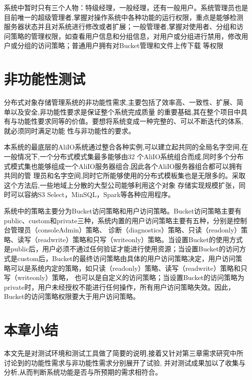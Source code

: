 系统中暂时只有三个人物：特级经理，一般经理，还有一般用户。系统管理员也是目前唯一的超级管理者,掌握对操作系统中各种功能的运行权限，重点是能够检测服务器状态并且对系统进行修改或者扩展；一般管理者,掌握对使用者、分组和访问策略的管理权限，如查看用户信息和分组信息，对用户或分组进行禁用，修改用户或分组的访问策略；普通用户拥有对Bucket管理和文件上传下载
等权限

\section{非功能性测试}

分布式对象存储管理系统的非功能性需求,主要包括了效率高、一致性、扩展、简单以及安全,非功能性要求是保证整个系统完成质量
的重要基础,其在整个项目中具有与功能性要求同等的价值。要想将系统变成一种完整的、可以不断迭代的体系,就必须同时满足功能
性与非功能性的要求。





本系统的最底层的AliIO系统通过整合各种实例,可以建立起共同的全局名字空间,在一般情况下,一个分布式模式集最多能够由32
个AliIO系统组合而成,同时多个分布式模式集也能够组成一个AliIO服务器组合,因此各个AliIO服务器组合都可以拥有共同的管
理员和名字空间,同时它所能够使用的分布式模板集也是无限多的。采取这个方法后,一些地域上分散的大型公司能够利用这个对象
存储实现规模扩张，同时可以容纳S3 Select，MinSQL，Spark等各种应用程序。


系统中的策略主要分为Bucket访问策略和用户访问策略。Bucket访问策略主要有public、custom和private三种，系统内置的用户访问策略主要有五种，分别是控制台管理员（consoleAdmin）策略、
诊断（diagnostics）策略、只读（readonly）策略、读写（readwrite）策略和只写（writeonly）策略。当设置Bucket的使用方式是public后，用户必须不通过任何验证才能进行使用资源；当设置Bucket的访问方式是custom后，Bucket的最终访问策略由具体的用户访问策略决定，用户访问策略可以是系统内定的策略，如只读（readonly）策略、读写（readwrite）策略和只写（writeonly）策略，
也可以是自定义的访问策略；当设置Bucket的访问策略为private时，用户未经授权不能进行任何操作，所有用户访问策略失效。因此，Bucket的访问策略权限要大于用户访问策略。



\section{本章小结}

本文先是对测试环境和测试工具做了简要的说明,接着又针对第三章需求研究中所讨论到的功能性需求与非功能性需求分别展开了试验,
并对测试成果加以了收集与分析,从而判断系统功能是否与所预期的需求相符合。